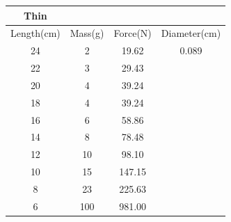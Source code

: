 \documentclass[12pt]{article}
\begin{document}
\centering
\begin{tabular}{|| c | c | c | c ||}
 \hline
 Thin &\ &\ &\ \\
 \hline
 Length(cm) & Mass(g) & Force(N) & Diameter(cm) \\
 \hline
 \hline
 24 & 2 & 19.62 & 0.089\\
 22 & 3 & 29.43 &\ \\
 20 & 4 & 39.24 &\ \\
 18 & 4 & 39.24 &\ \\
 16 & 6 & 58.86 &\ \\
 14 & 8 & 78.48 &\ \\
 12 & 10 & 98.10 &\ \\
 10 & 15 & 147.15 &\ \\
 8 & 23 & 225.63 &\ \\
 6 & 100 & 981.00 &\ \\
 \hline
\end{tabular}
\end{document}
